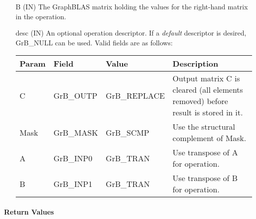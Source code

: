 \begin{itemize}[leftmargin=1.1in]
    \item[{\sf B}]     ({\sf IN}) The GraphBLAS matrix holding the values for
    the right-hand matrix in the operation.
    
    \item[{\sf desc}]  ({\sf IN}) An optional operation descriptor.  If a \emph{default}
    descriptor is desired, {\sf GrB\_NULL} can be used.  Valid fields are
    as follows: \\
    
    \begin{tabular}{lllp{2.5in}}
        Param & Field  & Value & Description \\
        \hline
        {\sf C}    & {\sf GrB\_OUTP} & {\sf GrB\_REPLACE} & Output matrix {\sf C} is cleared (all elements removed) before result is stored in it.\\
        {\sf Mask} & {\sf GrB\_MASK} & {\sf GrB\_SCMP}   & Use the structural complement of {\sf Mask}. \\
        {\sf A}    & {\sf GrB\_INP0} & {\sf GrB\_TRAN}   & Use transpose of {\sf A} for operation. \\
        {\sf B}    & {\sf GrB\_INP1} & {\sf GrB\_TRAN}   & Use transpose of {\sf B} for operation. \\
    \end{tabular}
\end{itemize}

\paragraph{Return Values}

